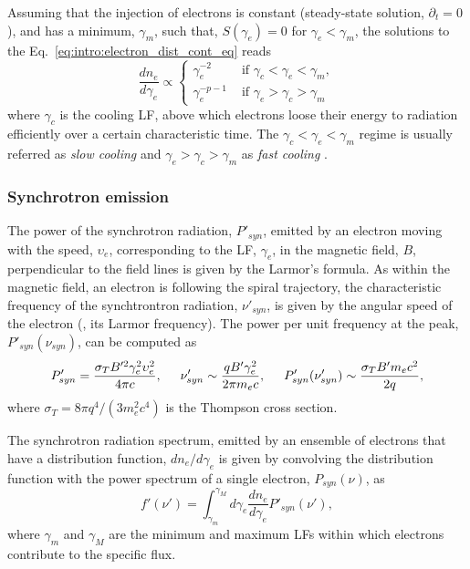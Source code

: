 Assuming that the injection of electrons is constant (steady-state solution,
$\partial_t = 0$), and has a minimum, $\gamma_m$, such that, 
$S(\gamma_e) = 0$ for $\gamma_e < \gamma_m$, the solutions to the Eq.~\eqref{eq:intro:electron_dist_cont_eq} reads 
%
\begin{equation}
\frac{dn_e}{d\gamma_e} \propto 
\begin{cases}
\gamma_e^{-2} &\text{ if } \gamma_c < \gamma_e < \gamma_m, \\
\gamma_e^{-p-1} &\text{ if } \gamma_e > \gamma_c > \gamma_m
\end{cases}
\label{eq:afterglow:elec_dist}
\end{equation}
%
where $\gamma_c$ is the cooling \ac{LF}, above which electrons loose their 
energy to radiation efficiently over a certain characteristic time.
%
The $\gamma_c < \gamma_e < \gamma_m$ regime is usually referred as 
\textit{slow cooling} and $\gamma_e > \gamma_c > \gamma_m$ as \textit{fast cooling} 
\citep{Sari:1997qe}.



\subsubsection{Synchrotron emission}

The power of the synchrotron radiation, $P'_{syn}$, emitted by an electron moving with 
the speed, $\upsilon_e$, corresponding to the \ac{LF}, $\gamma_e$, 
in the magnetic field, $B$, perpendicular to the field lines is given by the Larmor's formula.
%
As within the magnetic field, an electron is following the spiral trajectory,
the characteristic frequency of the synchtrontron radiation, $\nu'_{syn}$, is given 
by the angular speed of the electron (\eg, its Larmor frequency).
%
The power per unit frequency at the peak, $P'_{syn}(\nu_{syn})$, can be computed as 
\citep{RybickiLightman:1985}
%
\begin{equation}
P'_{syn} = \frac{\sigma_T B'^2\gamma_e^2\upsilon_e^2}{4\pi c}, 
\hspace{5mm} 
\nu'_{syn} \sim \frac{q B' \gamma_e^2}{2\pi m_e c},
\hspace{5mm}
P'_{syn}(\nu_{syn}') \sim \frac{\sigma_T B' m_e c^2}{2 q},
\end{equation}
%
where $\sigma_T = 8\pi q^4 / (3m_e^2c^4)$ is the Thompson cross section.


The synchrotron radiation spectrum, emitted by an ensemble of electrons that have a 
distribution function, $dn_e/d\gamma_e$ 
is given by convolving the distribution function with the power spectrum of a single 
electron, $P_{syn}(\nu)$, as 
%
\begin{equation}
f'(\nu') = \int_{\gamma_{m}}^{\gamma_M} d\gamma_e \frac{dn_e}{d\gamma_e}P'_{syn}(\nu'), 
\label{eq:afterglow:sync_power}
\end{equation}
%
where $\gamma_{m}$ and $\gamma_M$ are the minimum and maximum \acp{LF} 
within which electrons contribute to the specific flux.


